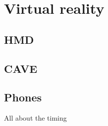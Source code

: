 \documentclass[12pt]{article}
\begin{document}
\section{Virtual reality}

\subsection{HMD}

\subsection{CAVE}

\subsection{Phones}

\begin{frame}{All about the timing}

\end{frame}
\end{document}
